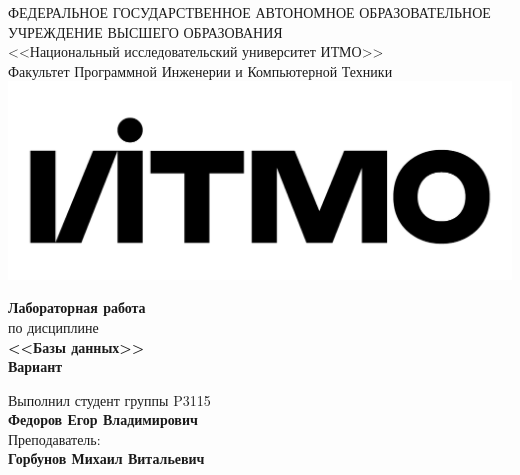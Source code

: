 \begin{titlepage}
\thispagestyle{firststyle}
\begin{center}
    ФЕДЕРАЛЬНОЕ ГОСУДАРСТВЕННОЕ АВТОНОМНОЕ ОБРАЗОВАТЕЛЬНОЕ УЧРЕЖДЕНИЕ ВЫСШЕГО ОБРАЗОВАНИЯ\\
    \vspace{0.5cm}
<<Национальный исследовательский университет ИТМО>>\\
Факультет Программной Инженерии и Компьютерной Техники \\
\vspace{1cm}
    \includegraphics[scale=0.1]{img/itmo_logo.png}
\end{center}

\vspace{1cm}

\begin{center}
    \large
    \textbf{Лабораторная работа }\\
    по дисциплине\\
    \textbf{<<Базы данных>>} \\
     \textbf{Вариант }
\end{center}

\vspace{2cm}

\begin{flushright}
  Выполнил студент  группы P3115\\
  \textbf{Федоров Егор Владимирович} \\
  Преподаватель: \\
  \textbf{Горбунов Михаил Витальевич}\\
\end{flushright}

\end{titlepage}